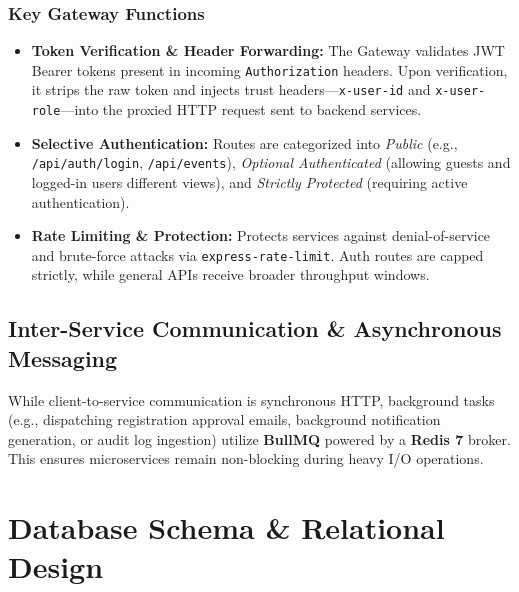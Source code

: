 \documentclass[12pt, a4paper]{report}
\begin{document}
\subsection{Key Gateway Functions}
\begin{itemize}
    \item \textbf{Token Verification \& Header Forwarding:} The Gateway validates JWT Bearer tokens present in incoming \texttt{Authorization} headers. Upon verification, it strips the raw token and injects trust headers---\texttt{x-user-id} and \texttt{x-user-role}---into the proxied HTTP request sent to backend services.
    \item \textbf{Selective Authentication:} Routes are categorized into \textit{Public} (e.g., \texttt{/api/auth/login}, \texttt{/api/events}), \textit{Optional Authenticated} (allowing guests and logged-in users different views), and \textit{Strictly Protected} (requiring active authentication).
    \item \textbf{Rate Limiting \& Protection:} Protects services against denial-of-service and brute-force attacks via \texttt{express-rate-limit}. Auth routes are capped strictly, while general APIs receive broader throughput windows.
\end{itemize}

\section{Inter-Service Communication \& Asynchronous Messaging}
While client-to-service communication is synchronous HTTP, background tasks (e.g., dispatching registration approval emails, background notification generation, or audit log ingestion) utilize \textbf{BullMQ} powered by a \textbf{Redis 7} broker. This ensures microservices remain non-blocking during heavy I/O operations.

\chapter{Database Schema \& Relational Design}
\end{document}
